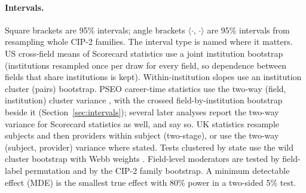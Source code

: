 \documentclass[11pt]{article}
\newcommand{\cic}[2]{$\langle #1,\,#2\rangle$}
\begin{document}
\paragraph{Intervals.} Square brackets are 95\% intervals; angle brackets \cic{\cdot}{\cdot} are 95\%
intervals from resampling whole CIP-2 families. The interval type is named where it matters. US
cross-field means of Scorecard statistics use a joint institution bootstrap (institutions resampled once
per draw for every field, so dependence between fields that share institutions is kept). Within-institution
slopes use an institution cluster (pairs) bootstrap. PSEO career-time statistics use the two-way (field,
institution) cluster variance \citep{cameron2011robust}, with the crossed field-by-institution bootstrap beside it
(Section~\ref{sec:intervals}); several later analyses report the two-way variance for Scorecard statistics as
well, and say so. UK statistics resample subjects and then providers within subject (two-stage), or use the
two-way (subject, provider) variance where stated. Tests clustered by state use the wild cluster bootstrap
\citep{cameron2008bootstrap} with Webb weights \citep{webb2023reworking}. Field-level moderators are tested by
field-label permutation and by the CIP-2 family bootstrap. A minimum detectable effect (MDE) is the smallest true
effect with 80\% power in a two-sided 5\% test.
\end{document}
